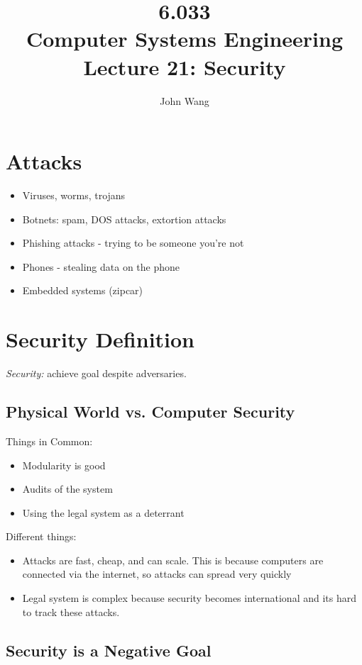 \documentclass[psamsfonts]{amsart}
\title{6.033 \\
Computer Systems Engineering \\
Lecture 21: Security}
\author{John Wang}
\begin{document}
\maketitle

\section{Attacks}

\begin{itemize}
  \item Viruses, worms, trojans
  \item Botnets: spam, DOS attacks, extortion attacks
  \item Phishing attacks - trying to be someone you're not
  \item Phones - stealing data on the phone
  \item Embedded systems (zipcar)
\end{itemize}

\section{Security Definition}

\emph{Security:} achieve goal despite adversaries.

\subsection{Physical World vs. Computer Security}

Things in Common:
\begin{itemize}
  \item Modularity is good
  \item Audits of the system
  \item Using the legal system as a deterrant
\end{itemize}

Different things:
\begin{itemize}
  \item Attacks are fast, cheap, and can scale. This is because computers are connected via the internet, so attacks can spread very quickly
  \item Legal system is complex because security becomes international and its hard to track these attacks.
\end{itemize}

\subsection{Security is a Negative Goal}
\end{document}
